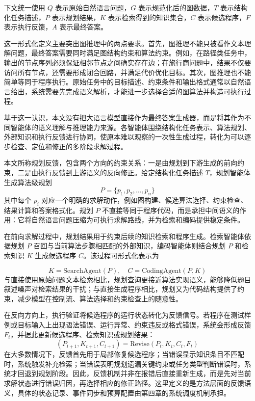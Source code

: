 下文统一使用 $Q$ 表示原始自然语言问题，$G$ 表示规范化后的图数据，$T$ 表示结构化任务描述，$P$ 表示规划结果，$K$ 表示检索得到的知识集合，$C$ 表示候选程序，$F$ 表示执行反馈，$A$ 表示最终答案。

这一形式化定义主要突出图推理中的两点要求。首先，图推理不能只被看作文本理解问题，最终答案需要同时满足图结构约束和算法约束。例如，在路径类任务中，输出的节点序列必须保证相邻节点之间确实存在边；在旅行商问题中，结果不仅要访问所有节点，还需要形成闭合回路，并满足代价优化目标。其次，图推理也不能简单等同于程序执行。原始任务中的目标描述、约束条件和输出格式通常以自然语言给出，系统需要先完成语义解析，才能进一步选择合适的图算法并构造可执行过程。

基于这一认识，本文没有把大语言模型直接作为最终答案生成器，而是将其作为不同智能体的语义理解与推理能力来源。各智能体围绕结构化任务表示、算法规划、外部知识和执行反馈进行协同，使原本难以观察的一次性生成过程，转化为可以逐步检查、定位和修正的多阶段求解过程。

本文所称规划反馈，包含两个方向的约束关系：一是由规划到下游生成的前向约束，二是由执行反馈到上游语义的反向修正。给定结构化任务描述 $T$，规划智能体生成算法级规划
\begin{equation}
P=\{p_1,p_2,\ldots,p_n\}
\end{equation}
其中每个 $p_i$ 对应一个明确的求解动作，例如图构建、候选算法选择、约束检查、结果计算和答案格式化。规划 $P$ 不直接等同于程序代码，而是承担中间语义的作用：它将自然语言问题压缩为可执行求解路线，并为检索和编码提供稳定条件。

在前向求解过程中，规划结果用于约束后续的知识检索和程序生成。检索智能体依据规划 $P$ 召回与当前算法步骤相匹配的外部知识，编码智能体则结合规划 $P$ 和检索知识 $K$ 生成候选程序 $C$。该过程可形式化表示为

\begin{equation}
K=\mathrm{SearchAgent}(P),\quad C=\mathrm{CodingAgent}(P,K)
\end{equation}
与直接使用原始问题文本检索相比，规划查询更接近算法实现语义，能够降低题目叙述噪声对检索结果的干扰；与直接生成程序相比，规划又为代码结构提供了约束，减少模型在控制流、算法选择和约束检查上的随意性。

在反向方向上，执行验证将候选程序的运行状态转化为反馈信号。若程序在测试样例或目标输入上出现语法错误、运行异常、约束违反或格式错误，系统会形成反馈 $F_t$，并据此更新候选程序、检索知识或规划结果：
\begin{equation}
(P_{t+1},K_{t+1},C_{t+1})=\mathrm{Revise}(P_t,K_t,C_t,F_t)
\end{equation}
在大多数情况下，反馈首先用于局部修复候选程序；当错误显示知识条目不匹配时，系统触发补充检索；当错误表明规划遗漏关键约束或任务类型判断错误时，系统才回退到规划阶段。因此，反馈机制并非在报错后直接重新生成，而是先对当前求解状态进行错误归因，再选择相应的修正路径。这里定义的是方法层面的反馈语义，具体的状态记录、事件同步和预算配置由第四章的系统调度机制承担。

